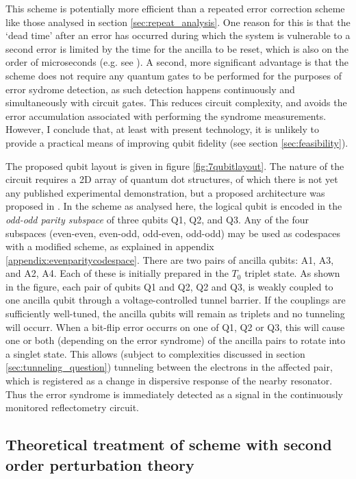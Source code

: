 \documentclass{report}
\begin{document}
This scheme is potentially more efficient than a repeated error correction scheme like those analysed in section \ref{sec:repeat_analysis}. One reason for this is that the `dead time' after an error has occurred during which the system is vulnerable to a second error is limited by the time for the ancilla to be reset, which is also on the order of microseconds (e.g. see \cite{Nakajima2019}). A second, more significant advantage is that the scheme does not require any quantum gates to be performed for the purposes of error sydrome detection, as such detection happens continuously and simultaneously with circuit gates. This reduces circuit complexity, and avoids the error accumulation associated with performing the syndrome measurements. However, I conclude that, at least with present technology, it is unlikely to provide a practical means of improving qubit fidelity (see section \ref{sec:feasibility}).


The proposed qubit layout is given in figure \ref{fig:7qubitlayout}. The nature of the circuit requires a 2D array of quantum dot structures, of which there is not yet any published experimental demonstration, but a proposed architecture was proposed in \cite{Tadokoro2021}. In the scheme as analysed here, the logical qubit is encoded in the \textit{odd-odd parity subspace} of three qubits Q1, Q2, and Q3. Any of the four subspaces (even-even, even-odd, odd-even, odd-odd) may be used as codespaces with a modified scheme, as explained in appendix \ref{appendix:evenparitycodespace}. There are two pairs of ancilla qubits: A1, A3, and A2, A4. Each of these is initially prepared in the $T_0$ triplet state. As shown in the figure, each pair of qubits Q1 and Q2, Q2 and Q3, is weakly coupled to one ancilla qubit through a voltage-controlled tunnel barrier. If the couplings are sufficiently well-tuned, the ancilla qubits will remain as triplets and no tunneling will occurr. When a bit-flip error occurrs on one of Q1, Q2 or Q3, this will cause one or both (depending on the error syndrome) of the ancilla pairs to rotate into a singlet state. This allows (subject to complexities discussed in section \ref{sec:tunneling_question}) tunneling between the electrons in the affected pair, which is registered as a change in dispersive response of the nearby resonator. Thus the error syndrome is immediately detected as a signal in the continuously monitored reflectometry circuit.

\subsection{Theoretical treatment of scheme with second order perturbation theory}
\end{document}
